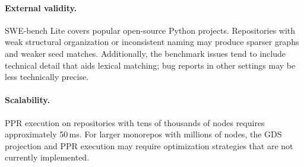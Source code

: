 \paragraph{External validity.}
SWE-bench Lite covers popular open-source Python projects. Repositories with weak structural organization or inconsistent naming may produce sparser graphs and weaker seed matches. Additionally, the benchmark issues tend to include technical detail that aids lexical matching; bug reports in other settings may be less technically precise.

\paragraph{Scalability.}
PPR execution on repositories with tens of thousands of nodes requires approximately 50\,ms. For larger monorepos with millions of nodes, the GDS projection and PPR execution may require optimization strategies that are not currently implemented.
